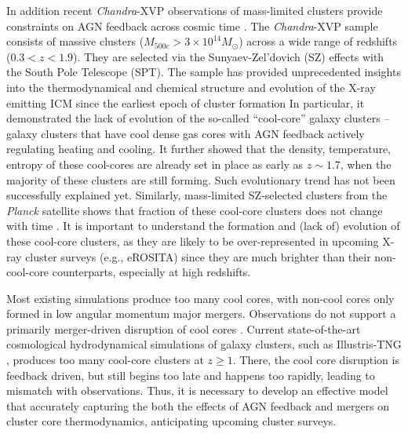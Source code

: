 \documentclass[letterpaper,11pt]{article}
\begin{document}
In addition recent {\em Chandra}-XVP observations of mass-limited clusters provide constraints on AGN feedback across cosmic time \citep{McDonald2017,McDonald2014}. The {\em Chandra}-XVP sample consists of massive clusters ($M_{500c} > 3\times 10^{14} M_\odot$) across a wide range of redshifts ($0.3 < z <1.9$). They are selected via the Sunyaev-Zel'dovich (SZ) effects with the South Pole Telescope (SPT).  The sample has provided unprecedented insights into the thermodynamical and chemical structure and evolution of the X-ray emitting ICM since the earliest epoch of cluster formation %
In particular, it demonstrated the lack of evolution of the so-called ``cool-core'' galaxy clusters -- galaxy clusters that have cool dense gas cores with AGN feedback actively regulating heating and cooling. It further showed that the density, temperature, entropy of these cool-cores are already set in place as early as $z \sim 1.7$, when the majority of these clusters are still forming. Such evolutionary trend has not been successfully explained yet. Similarly, mass-limited SZ-selected clusters from the {\em Planck} satellite shows that fraction of these cool-core clusters does not change with time \citep{Andrade-Santos2017,Rossetti2017}. It is important to understand the formation and (lack of) evolution of these cool-core clusters, as they are likely to be over-represented in upcoming X-ray cluster surveys (e.g., eROSITA) since they are much brighter than their non-cool-core counterparts, especially at high redshifts.  


Most existing simulations produce too many cool cores, with non-cool cores only formed in low angular momentum major mergers. Observations do not support a primarily merger-driven disruption of cool cores \citep{OHara2006}. Current state-of-the-art cosmological hydrodynamical simulations of galaxy clusters, such as Illustris-TNG \citep{Barnes2017b}, produces too many cool-core clusters at $z\geq 1$. There, the cool core disruption is feedback driven, but still begins too late and happens too rapidly, leading to mismatch with observations. Thus, it is necessary to develop an effective model that accurately capturing the both the effects of AGN feedback and mergers on cluster core thermodynamics, anticipating upcoming cluster surveys. 
\end{document}
